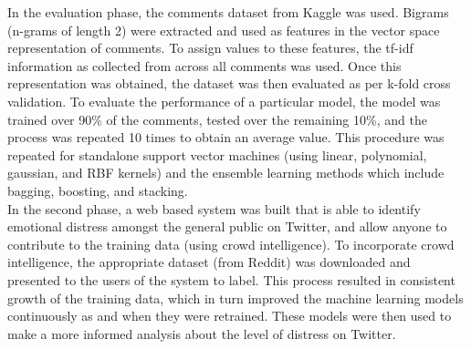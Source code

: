 In the evaluation phase, the comments dataset from Kaggle was used. Bigrams (n-grams of length 2) were extracted and used as features in the vector space representation of comments. To assign values to these features, the tf-idf information as collected from across all comments was used. Once this representation was obtained, the dataset was then evaluated as per k-fold cross validation. To evaluate the performance of a particular model, the model was trained over 90\% of the comments, tested over the remaining 10\%, and the process was repeated 10 times to obtain an average value. This procedure was repeated for standalone support vector machines (using linear, polynomial, gaussian, and RBF kernels) and the ensemble learning methods which include bagging, boosting, and stacking.\\

In the second phase, a web based system was built that is able to identify emotional distress amongst the general public on Twitter, and allow anyone to contribute to the training data (using crowd intelligence). To incorporate crowd intelligence, the appropriate dataset (from Reddit) was downloaded and presented to the users of the system to label. This process resulted in consistent growth of the training data, which in turn improved the machine learning models continuously as and when they were retrained. These models were then used to make a more informed analysis about the level of distress on Twitter.
